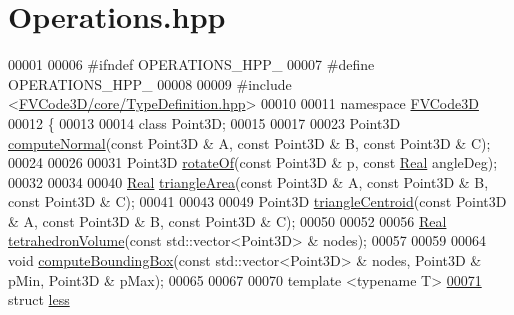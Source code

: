 \hypertarget{Operations_8hpp_source}{}\section{Operations.\+hpp}
\label{Operations_8hpp_source}

\begin{DoxyCode}
00001 
00006 \textcolor{preprocessor}{#ifndef OPERATIONS\_HPP\_}
00007 \textcolor{preprocessor}{#define OPERATIONS\_HPP\_}
00008 
00009 \textcolor{preprocessor}{#include <\hyperlink{TypeDefinition_8hpp}{FVCode3D/core/TypeDefinition.hpp}>}
00010 
00011 \textcolor{keyword}{namespace }\hyperlink{namespaceFVCode3D}{FVCode3D}
00012 \{
00013 
00014 \textcolor{keyword}{class }Point3D;
00015 
00017 
00023 Point3D \hyperlink{namespaceFVCode3D_afdf87b62988c2271186926eb3a3baedc}{computeNormal}(\textcolor{keyword}{const} Point3D & A, \textcolor{keyword}{const} Point3D & B, \textcolor{keyword}{const} Point3D & C);
00024 
00026 
00031 Point3D \hyperlink{namespaceFVCode3D_aefa056e4f7c5d10edd993b812dd670da}{rotateOf}(\textcolor{keyword}{const} Point3D & p, \textcolor{keyword}{const} \hyperlink{namespaceFVCode3D_a40c1f5588a248569d80aa5f867080e83}{Real} angleDeg);
00032 
00034 
00040 \hyperlink{namespaceFVCode3D_a40c1f5588a248569d80aa5f867080e83}{Real} \hyperlink{namespaceFVCode3D_a38b320ef9683fae74a67a2a5a921f0d9}{triangleArea}(\textcolor{keyword}{const} Point3D & A, \textcolor{keyword}{const} Point3D & B, \textcolor{keyword}{const} Point3D & C);
00041 
00043 
00049 Point3D \hyperlink{namespaceFVCode3D_a5b8d6a9c921fcd809d263ef9c484b1ad}{triangleCentroid}(\textcolor{keyword}{const} Point3D & A, \textcolor{keyword}{const} Point3D & B, \textcolor{keyword}{const} Point3D & C);
00050 
00052 
00056 \hyperlink{namespaceFVCode3D_a40c1f5588a248569d80aa5f867080e83}{Real} \hyperlink{namespaceFVCode3D_a8a6b07162e2801b628c3bd4057b9f221}{tetrahedronVolume}(\textcolor{keyword}{const} std::vector<Point3D> & nodes);
00057 
00059 
00064 \textcolor{keywordtype}{void} \hyperlink{namespaceFVCode3D_ae827f8be7749dd9703b52a52d90c9f9b}{computeBoundingBox}(\textcolor{keyword}{const} std::vector<Point3D> & nodes, Point3D & pMin, Point3D & 
      pMax);
00065 
00067 
00070 \textcolor{keyword}{template} <\textcolor{keyword}{typename} T>
\hypertarget{Operations_8hpp_source.tex_l00071}{}\hyperlink{structFVCode3D_1_1less}{00071} \textcolor{keyword}{struct }\hyperlink{structFVCode3D_1_1less}{less}

\end{DoxyCode}
